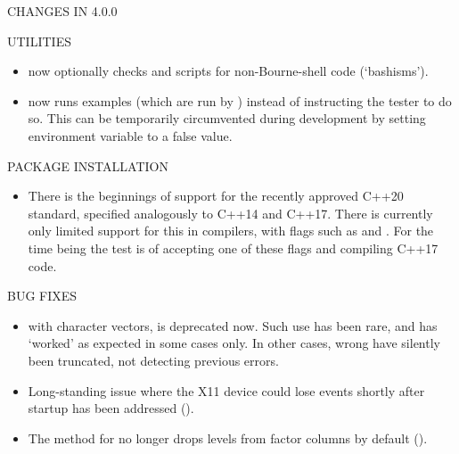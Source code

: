 \documentclass[letterpaper]{book}
\begin{document}
\begin{Section}{ CHANGES IN 4.0.0}
\begin{SubSection}{UTILITIES}
\begin{itemize}
\item{}  now optionally checks
 and  scripts for
non-Bourne-shell code (`bashisms').

\item{}  now runs 
examples (which are run by ) instead of
instructing the tester to do so.  This can be temporarily
circumvented during development by setting environment variable
 to a false value.

\end{itemize}


\end{SubSection}


%
\begin{SubSection}{PACKAGE INSTALLATION}
\begin{itemize}

\item{} There is the beginnings of support for the recently approved
C++20 standard, specified analogously to C++14 and C++17.  There is
currently only limited support for this in compilers, with flags
such as  and .  For the time
being the  test is of accepting one of these
flags and compiling C++17 code.

\end{itemize}


\end{SubSection}


%
\begin{SubSection}{BUG FIXES}
\begin{itemize}

\item{}  with  character vectors,
is deprecated now.  Such use has been rare, and has `worked'
as expected in some cases only.  In other cases, wrong  have
silently been truncated, not detecting previous errors.

\item{} Long-standing issue where the X11 device could lose events
shortly after startup has been addressed ().

\item{} The  method for  no longer
drops  levels from factor columns by default
().


\end{itemize}
\end{SubSection}
\end{Section}
\end{document}

